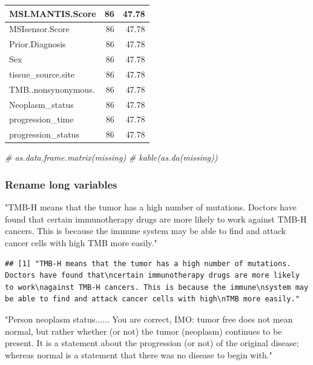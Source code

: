 \documentclass[
  11pt,
]{article}
\newenvironment{Shaded}{\begin{snugshade}}{\end{snugshade}}
\newcommand{\CommentTok}[1]{\textcolor[rgb]{0.56,0.35,0.01}{\textit{#1}}}
\newcommand{\StringTok}[1]{\textcolor[rgb]{0.31,0.60,0.02}{#1}}
\begin{document}
\begin{tabular}{l|r|r}
\hline
MSI.MANTIS.Score & 86 & 47.78\\
\hline
MSIsensor.Score & 86 & 47.78\\
\hline
Prior.Diagnosis & 86 & 47.78\\
\hline
Sex & 86 & 47.78\\
\hline
tissue\_source.site & 86 & 47.78\\
\hline
TMB..nonsynonymous. & 86 & 47.78\\
\hline
Neoplasm\_status & 86 & 47.78\\
\hline
progression\_time & 86 & 47.78\\
\hline
progression\_status & 86 & 47.78\\
\hline
\end{tabular}

\begin{Shaded}
\begin{Highlighting}[]
\CommentTok{\# as.data.frame.matrix(missing)}
\CommentTok{\# kable(as.da(missing))}
\end{Highlighting}
\end{Shaded}

\subsubsection{Rename long variables}

\begin{Shaded}
\begin{Highlighting}[]
\StringTok{"TMB{-}H means that the tumor has a high number of mutations. Doctors have found that}
\StringTok{certain immunotherapy drugs are more likely to work}
\StringTok{against TMB{-}H cancers. This is because the immune}
\StringTok{system may be able to find and attack cancer cells with high}
\StringTok{TMB more easily."}
\end{Highlighting}
\end{Shaded}

\begin{verbatim}
## [1] "TMB-H means that the tumor has a high number of mutations. Doctors have found that\ncertain immunotherapy drugs are more likely to work\nagainst TMB-H cancers. This is because the immune\nsystem may be able to find and attack cancer cells with high\nTMB more easily."
\end{verbatim}

\begin{Shaded}
\begin{Highlighting}[]
\StringTok{"Person neoplasm status...... You are correct, IMO:  tumor free does not mean normal, but rather whether (or not) the tumor (neoplasm) continues to be present.  It is a statement about the progression (or not) of the original disease; whereas normal is a statement that there was no disease to begin with."}
\end{Highlighting}
\end{Shaded}
\end{document}
